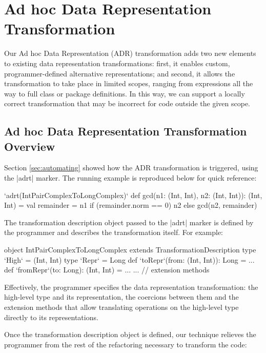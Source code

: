\section{Ad hoc Data Representation Transformation}
\label{sec:ildl}

Our Ad hoc Data Representation (ADR) transformation adds two new
elements to existing data representation transformations: first, it
enables custom, programmer-defined alternative representations; and
second, it allows the transformation to take place in limited scopes,
ranging from expressions all the way to full class or package
definitions. In this way, we can support a locally correct
transformation that may be incorrect for code outside the given scope.

\subsection{Ad hoc Data Representation Transformation Overview}
\label{sec:ildl:user-story}

Section \ref{sec:automating} showed how the ADR transformation is triggered, using the |adrt| marker. The running example is reproduced below for quick
reference:

\begin{lstlisting-nobreak}
`adrt(IntPairComplexToLongComplex)` {
  def gcd(n1: (Int, Int), n2: (Int, Int)): (Int, Int) = {
    val remainder = n1 %
    if (remainder.norm == 0) n2 else gcd(n2, remainder)
  }
}
\end{lstlisting-nobreak}

The transformation description object passed to the |adrt| marker is defined by the programmer and describes the transformation itself. For example:

\begin{lstlisting-nobreak}
object IntPairComplexToLongComplex extends TransformationDescription {
  type `High` = (Int, Int)
  type `Repr` = Long
  def `toRepr`(from: (Int, Int)): Long = ...
  def `fromRepr`(to: Long): (Int, Int) = ...
  ... // extension methods
}
\end{lstlisting-nobreak}

Effectively, the programmer specifies the data representation transformation: the high-level type and its representation, the coercions between them and the extension methods that allow translating operations on the high-level type directly to its representations.

Once the transformation description object is defined, our technique relieves the programmer from the rest of the refactoring necessary to transform the code:

